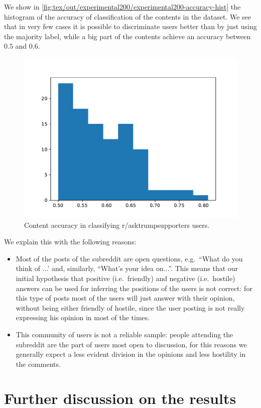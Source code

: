 
We show in \autoref{fig:tex/out/experimental200/experimental200-accuracy-hist}
the histogram of the accuracy of classification of the contents in the dataset.
We see that in very few cases it is possible to discriminate users better than
by just using the majority label, while a big part of the contents achieve an
accuracy between $0.5$ and $0.6$.

\begin{figure}
	\centering
	\includegraphics[width=0.6\linewidth]{tex/out/experimental200/experimental200-accuracy-hist.pdf}
	\caption{Content accuracy in classifying r/asktrumpsupporters users.}%
	\label{fig:tex/out/experimental200/experimental200-accuracy-hist}
\end{figure}

We explain this with the following reasons:
\begin{itemize}
	\item Most of the posts of the subreddit are open questions, e.g.\ ``What
	      do you think of ...' and, similarly, ``What's your idea on...''. This
	      means that our initial hypothesis that positive (i.e.\ friendly) and negative
	      (i.e.\ hostile) answers can be used for inferring the positions of
	      the users is not correct: for this type of posts most of the users
	      will just answer with their opinion, without being either friendly of
	      hostile, since the user posting is not really expressing his opinion
	      in most of the times.
	\item This community of users is not a reliable sample: people attending
	      the subreddit are the part of users most open to discussion, for this
	      reasons we generally expect a less evident division in the opinions and
	      less hostility in the comments.
\end{itemize}

\section{Further discussion on the results}%
\label{sec:discussion}

